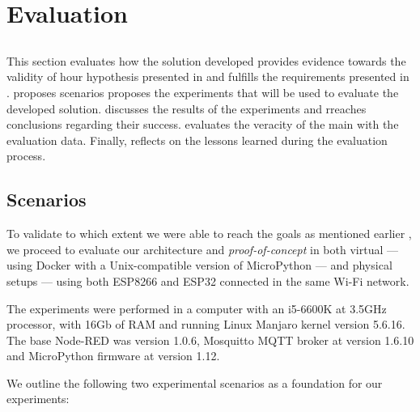 \chapter{Evaluation}\label{chap:evaluation}

\section*{}

\minitoc \mtcskip \noindent
This section evaluates how the solution developed provides evidence towards the validity of hour hypothesis presented in  and fulfills the requirements presented in .  proposes scenarios  proposes the experiments that will be used to evaluate the developed solution.  discusses the results of the experiments and rreaches conclusions regarding their success.  evaluates the veracity of the main with the evaluation data. Finally,  reflects on the lessons learned during the evaluation process. 

\section{Scenarios}\label{sec:scenarios}

To validate to which extent we were able to reach the goals as mentioned earlier , we proceed to evaluate our architecture and \textit{proof-of-concept} in both virtual --- using Docker with a Unix-compatible version of MicroPython --- and physical setups --- using both ESP8266 and ESP32 connected in the same Wi-Fi network.

The experiments were performed in a computer with an i5-6600K at 3.5GHz processor, with 16Gb of RAM and running Linux Manjaro kernel version 5.6.16. The base Node-RED was version 1.0.6, Mosquitto MQTT broker at version 1.6.10 and MicroPython firmware at version 1.12.

We outline the following two experimental scenarios as a foundation for our experiments:

